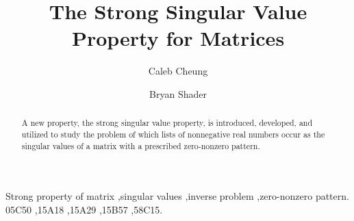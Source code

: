 \documentclass[preprint,12pt]{elsarticle}
\begin{document}
\begin{frontmatter}

\title{The Strong Singular Value Property for Matrices}


\author[label1]{Caleb Cheung} %
\author[label1]{Bryan Shader}
\begin{abstract}
A new property, the  strong singular value property, is 
introduced, developed, and utilized to study the problem of which lists of nonnegative real numbers occur as the  singular values of a matrix with a prescribed zero-nonzero pattern. 
\end{abstract}



\begin{keyword}
Strong property of matrix \sep  singular values \sep inverse problem \sep  zero-nonzero pattern. 
\MSC 
05C50 \sep 15A18 \sep 15A29 \sep  15B57 \sep 58C15.
\end{keyword}

\end{frontmatter}
\end{document}
